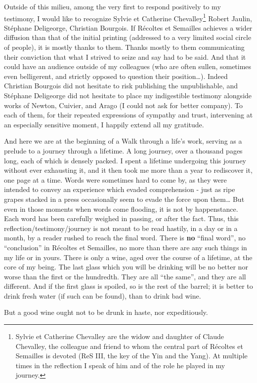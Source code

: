 Outside of this milieu, among the very first to respond positively to my testimony,
I would like to recognize 
Sylvie et Catherine Chevalley\footnote{Sylvie et Catherine Chevalley are the widow and
daughter of Claude Chevalley, the colleague and friend to whom the central part of 
R\'ecoltes et Semailles is devoted (ReS III, the key of the Yin and the Yang).
At multiple times in the reflection I speak of him and of the role he played in my
journey.} Robert Jaulin, St\'ephane Deligeorge, Christian Bourgois. 
If R\'ecoltes et Semailles achieves a wider diffusion than that of the initial 
printing (addressed to a very limited social circle of people), it is mostly thanks to
them. Thanks mostly to them communicating their 
conviction that what I strived to seize and say had to be said. 
And that it could have an audience outside of my colleagues (who are often sullen,
sometimes even belligerent, and strictly opposed to question their position\ldots).
Indeed Christian Bourgois did not hesitate to risk publishing the unpublishable, and
St\'ephane Deligeorge did not hesitate to place my 
indigestible testimony alongside works of Newton, Cuivier, and Arago (I could not ask for
better company).
To each of them, for their repeated expressions of sympathy and trust, intervening at an
especially sensitive moment, I happily extend all my gratitude. 

And here we are at the beginning of a Walk through a life's work, serving as a prelude to
a journey through a lifetime. 
A long journey, over a thousand pages long, each of which is
densely packed. I spent a lifetime undergoing this journey without ever 
exhausting it, and it then took me more than a year to rediscover it, 
one page at a time.
Words were sometimes hard to come by, as they were 
intended to convey an experience which evaded comprehension - just as ripe grapes stacked
in a press occasionally seem to evade the force upon them\ldots
But even in those moments when words come flooding, it is not by happenstance. 
Each word has been carefully 
weighed in passing, or after the fact.
Thus, this reflection/testimony/journey is not meant to be read hastily, in a day or in a
month, by a reader rushed to reach the final word. There is \textbf{no} 
``final word'', no
``conclusion'' in 
R\'ecoltes et Semailles, no more than there are any such things in my life or in yours. 
There is only a wine, aged over the course of a lifetime, at the core of my being.
The last glass which you will be drinking will be no better nor worse than the first or the
hundredth. 
They are all ``the same'', and they are all different. And if the first glass is spoiled,
so is the rest of the barrel; it is better to drink fresh water (if such can be found),
than to drink bad wine. 

But a good wine ought not to be drunk in haste, nor 
expeditiously. 

